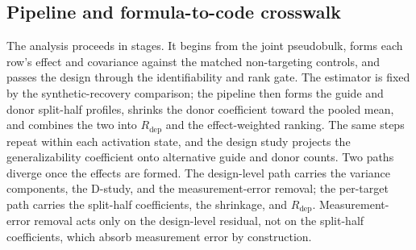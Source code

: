 \documentclass[11pt]{article}
\begin{document}
\subsection{Pipeline and formula-to-code crosswalk}

The analysis proceeds in stages. It begins from the joint pseudobulk, forms each
row's effect and covariance against the matched non-targeting controls, and passes the
design through the identifiability and rank gate. The estimator is fixed by the
synthetic-recovery comparison; the pipeline then forms the guide and donor split-half
profiles, shrinks the donor coefficient toward the pooled mean, and combines the two
into $R_{\mathrm{dep}}$ and the effect-weighted ranking. The same steps repeat within
each activation state, and the design study projects the generalizability coefficient
onto alternative guide and donor counts. Two paths diverge once the effects are
formed. The design-level path carries the variance components, the D-study, and the
measurement-error removal; the per-target path carries the split-half coefficients,
the shrinkage, and $R_{\mathrm{dep}}$. Measurement-error removal acts only on the
design-level residual, not on the split-half coefficients, which absorb measurement
error by construction.

\begin{table}[t]
  \centering
  \caption{What each quantity is in the released code, against its paper-grade
  target.}
  \label{tab:crosswalk}
\end{table}
\end{document}
